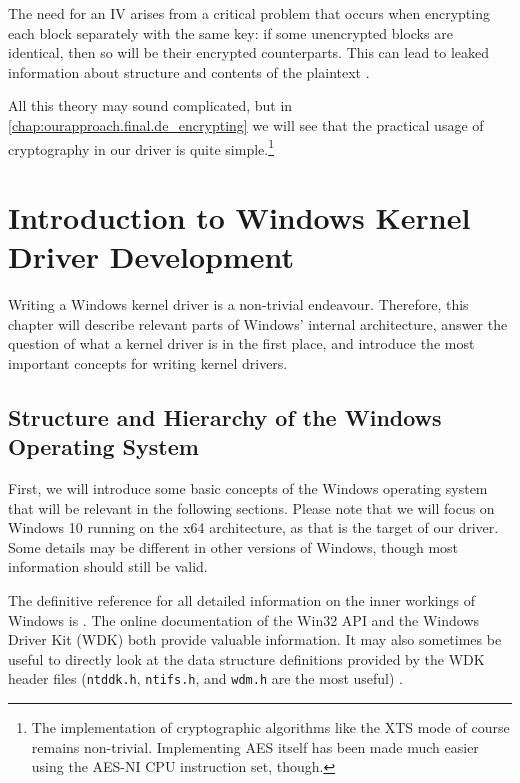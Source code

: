 The need for an IV arises from a critical problem that occurs when encrypting each block separately with the same key: if some unencrypted blocks are identical, then so will be their encrypted counterparts. This can lead to leaked information about structure and contents of the plaintext \cite{Ferguson2010}.

All this theory may sound complicated, but in \autoref{chap:ourapproach.final.de_encrypting} we will see that the practical usage of cryptography in our driver is quite simple.\footnote{\label{fn:background.luks2.simplecryptography} The implementation of cryptographic algorithms like the XTS mode of course remains non-trivial. Implementing AES itself has been made much easier using the AES-NI CPU instruction set, though.}

\section{Introduction to Windows Kernel Driver Development}
\label{chap:background.kerneldriver}
Writing a Windows kernel driver is a non-trivial endeavour. Therefore, this chapter will describe relevant parts of Windows' internal architecture, answer the question of what a kernel driver is in the first place, and introduce the most important concepts for writing kernel drivers.

\subsection{Structure and Hierarchy of the Windows Operating System}
\label{chap:background.kerneldriver.oshierarchy}
First, we will introduce some basic concepts of the Windows operating system that will be relevant in the following sections. Please note that we will focus on Windows 10 running on the x64 architecture, as that is the target of our driver. Some details may be different in other versions of Windows, though most information should still be valid.

The definitive reference for all detailed information on the inner workings of Windows is \cite{Yosifovich2017}. The online documentation of the Win32 API \cite{Win32} and the Windows Driver Kit (WDK) \cite{Wdk} both provide valuable information. It may also sometimes be useful to directly look at the data structure definitions provided by the WDK header files (\texttt{ntddk.h}, \texttt{ntifs.h}, and \texttt{wdm.h} are the most useful) \cite{Yosifovich2017}.

